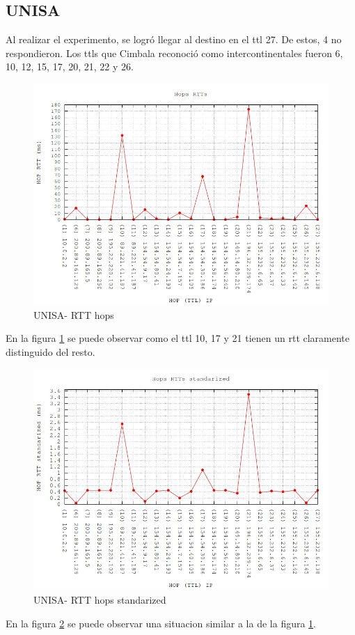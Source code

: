 \subsection{UNISA}

Al realizar el experimento, se logró llegar al destino en el ttl 27. De estos, 4 no respondieron. Los ttls que Cimbala reconoció como intercontinentales fueron 6, 10, 12, 15, 17, 20, 21, 22 y 26.

\begin{figure}[!htbp]
  \centering
    \includegraphics[scale=0.6]{imagenes/unisa-graficos/traceroute-unisa.jpg}
  \caption{UNISA- RTT hops}
  \label{fig:1}
\end{figure}

En la figura \ref{fig:1} se puede observar como el ttl 10, 17 y 21 tienen un rtt claramente distinguido del resto.

\begin{figure}[!htbp]
  \centering
    \includegraphics[scale=0.6]{imagenes/unisa-graficos/traceroute-unisa-standarized.jpg}
  \caption{UNISA- RTT hops standarized}
  \label{fig:2}
\end{figure}

En la figura \ref{fig:2} se puede observar una situacion similar a la de la figura \ref{fig:1}.

